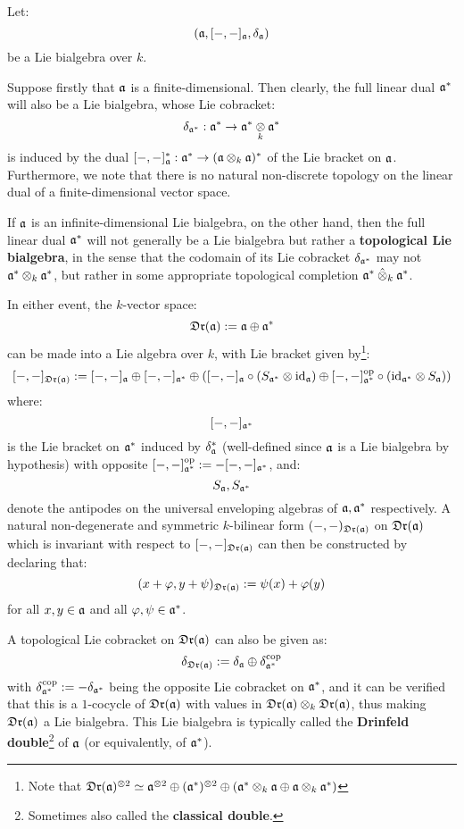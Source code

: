         \begin{remark} \label{remark: drinfeld_doubles}
            Let:
                $$(\mathfrak{a}, [-, -]_{\mathfrak{a}}, \delta_{\mathfrak{a}})$$
            be a Lie bialgebra over $k$.
        
            Suppose firstly that $\mathfrak{a}$ is a finite-dimensional. Then clearly, the full linear dual $\mathfrak{a}^*$ will also be a Lie bialgebra, whose Lie cobracket:
                $$\delta_{\a^*}: \a^* \to \a^* \tensor_k \a^*$$
            is induced by the dual $[-, -]_{\a}^*: \a^* \to (\a \tensor_k \a)^*$ of the Lie bracket on $\mathfrak{a}$. Furthermore, we note that there is no natural non-discrete topology on the linear dual of a finite-dimensional vector space.

            If $\mathfrak{a}$ is an infinite-dimensional Lie bialgebra, on the other hand, then the full linear dual $\mathfrak{a}^*$ will not generally be a Lie bialgebra but rather a \textbf{topological Lie bialgebra}, in the sense that the codomain of its Lie cobracket $\delta_{\mathfrak{a}^*}$ may not $\a^* \tensor_k \a^*$, but rather in some appropriate topological completion $\a^* \hattensor_k \a^*$.

            In either event, the $k$-vector space:
                $$\mathfrak{Dr}(\mathfrak{a}) := \mathfrak{a} \oplus \mathfrak{a}^*$$
            can be made into a Lie algebra over $k$, with Lie bracket given by\footnote{Note that $\frakDr(\a)^{\tensor 2} \cong \a^{\tensor 2} \oplus (\a^*)^{\tensor 2} \oplus (\a^* \tensor_k \a \oplus \a \tensor_k \a^*)$}:
                $$[-, -]_{\frakDr(\a)} := [-, -]_{\a} \oplus [-, -]_{\a^*} \oplus ( [-, -]_{\a} \circ (S_{\a^*} \tensor \id_{\a}) \oplus [-, -]_{\a^*}^{\op} \circ (\id_{\a^*} \tensor S_{\a}) )$$
            where:
                $$[-, -]_{\mathfrak{a}^*}$$
            is the Lie bracket on $\mathfrak{a}^*$ induced by $\delta_{\mathfrak{a}}^*$ (well-defined since $\mathfrak{a}$ is a Lie bialgebra by hypothesis) with opposite $[-, -]_{\mathfrak{a}^*}^{\mathrm{op}} := -[-, -]_{\mathfrak{a}^*}$, and:
                $$S_{\mathfrak{a}}, S_{\mathfrak{a}^*}$$
            denote the antipodes on the universal enveloping algebras of $\mathfrak{a}, \mathfrak{a}^*$ respectively. A natural non-degenerate and symmetric $k$-bilinear form $(-, -)_{\mathfrak{Dr}(\mathfrak{a})}$ on $\mathfrak{Dr}(\mathfrak{a})$ which is invariant with respect to $[-, -]_{\mathfrak{Dr}(\mathfrak{a})}$ can then be constructed by declaring that:
                $$(x + \varphi, y + \psi)_{\mathfrak{Dr}(\mathfrak{a})} := \psi(x) + \varphi(y)$$
            for all $x, y \in \mathfrak{a}$ and all $\varphi, \psi \in \mathfrak{a}^*$. 

            A topological Lie cobracket on $\mathfrak{Dr}(\mathfrak{a})$ can also be given as:
                $$\delta_{\mathfrak{Dr}(\mathfrak{a})} := \delta_{\mathfrak{a}} \oplus \delta_{\mathfrak{a}^*}^{\mathrm{cop}}$$
            with $\delta_{\mathfrak{a}^*}^{\mathrm{cop}} := -\delta_{\mathfrak{a}^*}$ being the opposite Lie cobracket on $\mathfrak{a}^*$, and it can be verified that this is a $1$-cocycle of $\mathfrak{Dr}(\mathfrak{a})$ with values in $\frakDr(\a) \tensor_k \frakDr(\a)$, thus making $\mathfrak{Dr}(\mathfrak{a})$ a Lie bialgebra. This Lie bialgebra is typically called the \textbf{Drinfeld double}\footnote{Sometimes also called the \textbf{classical double}.} of $\mathfrak{a}$ (or equivalently, of $\mathfrak{a}^*$).
        \end{remark}
        
